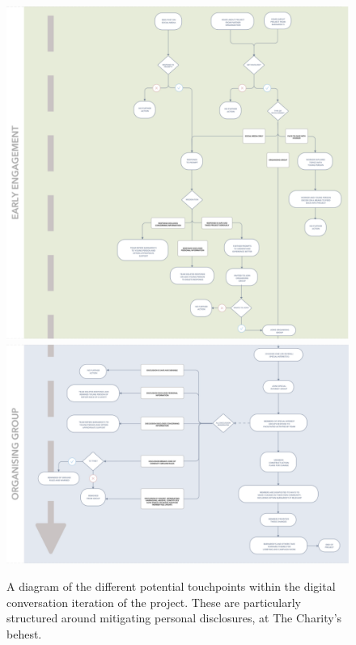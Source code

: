 \begin{figure}[hbt!]
    \centering

\includegraphics[]{Images/7/iof-process-1.png}
\includegraphics[]{Images/7/iof-process-2.png}
    \caption{A diagram of the different potential touchpoints within the digital conversation iteration of the project. These are particularly structured around mitigating personal disclosures, at The Charity's behest.}
    \label{fig:iof-process}
\end{figure}


